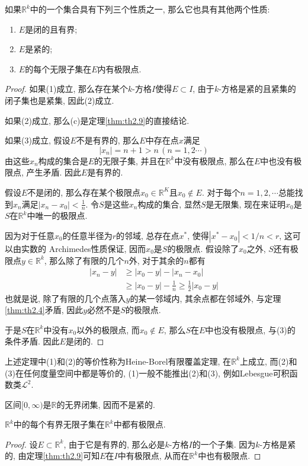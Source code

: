 \documentclass[cn,12pt,math=mtpro2,citestyle=gb7714-2015,bibstyle=gb7714-2015,twocol]{elegantbook}
\newcommand{\R}{\mathbb{R}}
\begin{document}
\begin{theorem}\label{thm:th2.16}
  如果$\R^k$中的一个集合具有下列三个性质之一, 那么它也具有其他两个性质:
  \begin{enumerate}[label=(\arabic*)]
  \item $E$是闭的且有界;

  \item $E$是紧的;

  \item $E$的每个无限子集在$E$内有极限点.
  \end{enumerate}
\end{theorem}
\begin{proof}
  如果(1)成立, 那么存在某个$k$-方格$I$使得$E\subset I$, 由于$k$-方格是紧的且紧集的闭子集也是紧集, 因此(2)成立.

  如果(2)成立, 那么(c)是定理\ref{thm:th2.9}的直接结论.

  如果(3)成立, 假设$E$不是有界的, 那么$E$中存在点$x$满足
  $$|x_n|=n+1>n\,(n=1,2\cdots)$$
  由这些$x_n$构成的集合是$E$的无限子集, 并且在$\R^k$中没有极限点, 那么在$E$中也没有极限点, 产生矛盾. 因此$E$是有界的.

  假设$E$不是闭的, 那么存在某个极限点$x_0\in \R^K$且$x_0\notin E$. 对于每个$n=1,2,\cdots$总能找到$x_n$满足$|x_n-x_0|<\displaystyle \frac{1}{n}$. 令$S$是这些$x_n$构成的集合, 显然$S$是无限集, 现在来证明$x_0$是$S$在$\R^k$中唯一的极限点.

  因为对于任意$x_0$的任意半径为$r$的邻域, 总存在点$x^\ast$, 使得$\displaystyle |x^\ast-x_0|<1/n<r$, 这可以由实数的
  Archimedes性质保证, 因而$x_0$是$S$的极限点. 假设除了$x_0$之外, $S$还有极限点$y \in \R^k$, 那么除了有限的几个$n$外, 对于其余的$n$都有
  \begin{align*}
  |x_n-y |&\geq |x_0-y |-|x_n-x_0| \\
  &\geq|x_0-y |-\frac{1}{n}\geq\frac{1}{2}|x_0-y|
  \end{align*}
  也就是说, 除了有限的几个点落入$y$的某一邻域内, 其余点都在邻域外, 与定理\ref{thm:th2.4}矛盾, 因此$y$必然不是$S$的极限点.

  于是$S$在$\R^k$中没有$x_0$以外的极限点, 而$x_0\notin E$, 那么$S$在$E$中也没有极限点, 与(3)的条件矛盾. 因此$E$是闭的.


\end{proof}
\begin{remark}
上述定理中(1)和(2)的等价性称为Heine-Borel有限覆盖定理, 在$\R^k$上成立, 而(2)和(3)在任何度量空间中都是等价的, (1)一般不能推出(2)和(3), 例如Lebesgue可积函数类$\mathscr{L}^2$.
\end{remark}
\begin{example}
区间$[0,\infty)$是$\R$的无界闭集, 因而不是紧的.
\end{example}
\begin{theorem}[Weierstrass定理]\label{thm:th2.17}
  $\R^k$中的每个有界无限子集在$\R^k$中都有极限点.
\end{theorem}
\begin{proof}
  设$E\subset\R^k$, 由于它是有界的, 那么必是$k$-方格$I$的一个子集. 因为$k$-方格是紧的, 由定理\ref{thm:th2.9}可知$E$在$I$中有极限点, 从而在$\R^k$中也有极限点.

\end{proof}
\end{document}
